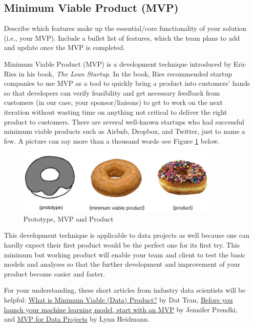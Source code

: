 \documentclass{article}
\begin{document}
\subsection{Minimum Viable Product (MVP)}
Describe which features make up the essential/core functionality of your solution (i.e., your MVP).
Include a bullet list of features, which the team plans to add and update once the MVP is completed.

Minimum Viable Product (MVP) is a development technique introduced by Eric Ries in his book, \emph{The Lean Startup}. In the book, Ries recommended startup companies to use MVP as a tool to quickly bring a product into customers' hands so that developers can verify feasibility and get necessary feedback from customers (in our case, your sponsor/liaisons) to get to work on the next iteration without wasting time on anything not critical to deliver the right product to customers.\cite{ries2011lean} There are several well-known startups who had successful minimum viable products such as Airbnb, Dropbox, and Twitter, just to name a few. A picture can say more than a thousand words--see Figure \ref{fig:mvp-pic} below.

\begin{figure}[h]
\centering
\includegraphics[width=10cm]{prototype-mvp-product.jpg}
\caption{Prototype, MVP and Product}
\label{fig:mvp-pic} %
\small
\end{figure}

This development technique is applicable to data projects as well because one can hardly expect their first product would be the perfect one for its first try. This minimum but working product will enable your team and client to test the basic models and analyses so that the further development and improvement of your product become easier and faster.

For your understanding, these short articles from industry data scientists will be helpful: \href{https://medium.com/idealo-tech-blog/what-is-minimum-viable-data-product-49269e338d85}{What is Minimum Viable (Data) Product?} by Dat Tran, \href{https://venturebeat.com/2018/11/24/before-you-launch-your-machine-learning-model-start-with-an-mvp/}{Before you launch your machine learning model, start with an MVP} by Jennifer Prendki, and \href{https://blog.dataiku.com/mvp-for-data-projects}{MVP for Data Projects} by Lynn Heidmann. \cite{MVPforDP}  
\end{document}

